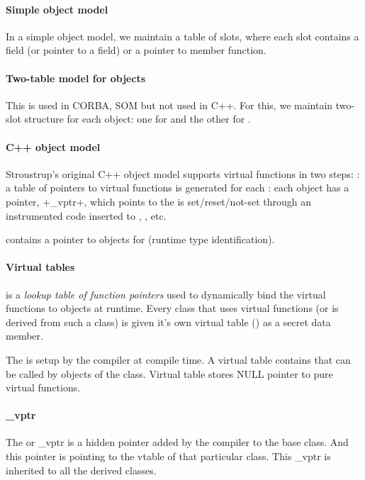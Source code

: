 \documentclass{memo}
\begin{document}
\small
{}


\paragraph{Simple object model}
In a simple object model, we maintain a table of slots, where each slot
contains a field (or pointer to a field) or a pointer to member function.

\paragraph{Two-table model for objects}
This is used in CORBA, SOM but not used in C++.
For this, we maintain two-slot structure for each object: one for 
and the other for .

\paragraph{C++ object model}
Stroustrup's original C++ object model supports virtual functions in two
steps:
\bit
\w {}: a table of pointers to virtual functions is
  generated for each 
\w {}: each object has a pointer, \bb+\_vptr+, which points to the
\eit
{} is set/reset/not-set through an instrumented code inserted to
, , etc.

 contains a pointer to  objects for 
(runtime type identification). 


\paragraph{Virtual tables}
 is a {\em lookup table of function pointers\/} used to
dynamically bind the virtual functions to objects at runtime. Every class that
uses virtual functions (or is derived from such a class) is given it's own
virtual table () as a secret data member. 

The  is setup
by the compiler at compile time. A virtual table contains  that can be called by objects of
the class.  Virtual table stores NULL pointer to pure virtual functions.

\paragraph{\_vptr}
The  or {\_vptr} is a hidden pointer added by the compiler
to the base class. And this pointer is pointing to the vtable of that
particular class. This \_vptr is inherited to all the derived classes. 
\end{document}
